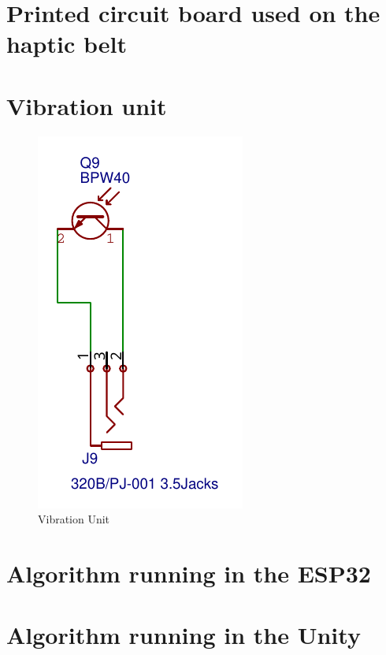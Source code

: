 

\section{Printed circuit board used on the haptic belt}


    
\pagebreak

\section{Vibration unit}

    \begin{figure}[htbp]
        \centering
        \hspace{1cm}
        \includegraphics[width=.45\textwidth]{Apend Cinto/Unidade Vibracao.pdf}
        \caption{Vibration Unit}
        \label{vibration_unit}
    \end{figure}
    
\pagebreak
    
\section{Algorithm running in the ESP32}


\section{Algorithm running in the Unity}

